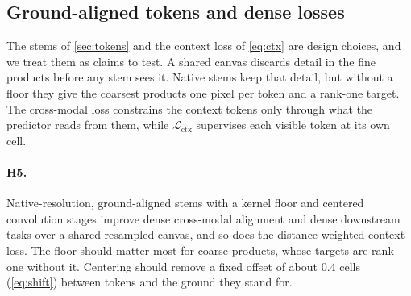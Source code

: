 \subsection{Ground-aligned tokens and dense losses}
\label{sec:h5}

The stems of \cref{sec:tokens} and the context loss of \cref{eq:ctx} are design choices, and we treat them as claims to test. A shared canvas discards detail in the fine products before any stem sees it. Native stems keep that detail, but without a floor they give the coarsest products one pixel per token and a rank-one target. The cross-modal loss constrains the context tokens only through what the predictor reads from them, while $\mathcal{L}_{\text{ctx}}$ supervises each visible token at its own cell.

\paragraph{H5.} Native-resolution, ground-aligned stems with a kernel floor and centered convolution stages improve dense cross-modal alignment and dense downstream tasks over a shared resampled canvas, and so does the distance-weighted context loss. The floor should matter most for coarse products, whose targets are rank one without it. Centering should remove a fixed offset of about 0.4 cells (\cref{eq:shift}) between tokens and the ground they stand for.

